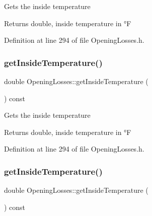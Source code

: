 Gets the inside temperature

\begin{DoxyReturn}{Returns}
double, inside temperature in °F 
\end{DoxyReturn}


Definition at line 294 of file Opening\+Losses.\+h.

\mbox{\label{class_opening_losses_abe930dab77b1c855503ee51fdf66c88a}} 
\subsubsection{\texorpdfstring{get\+Inside\+Temperature()}{getInsideTemperature()}\hspace{0.1cm}{\footnotesize\ttfamily [2/3]}}
{\footnotesize\ttfamily double Opening\+Losses\+::get\+Inside\+Temperature (\begin{DoxyParamCaption}{ }\end{DoxyParamCaption}) const\hspace{0.3cm}{\ttfamily [inline]}}

Gets the inside temperature

\begin{DoxyReturn}{Returns}
double, inside temperature in °F 
\end{DoxyReturn}


Definition at line 294 of file Opening\+Losses.\+h.

\mbox{\label{class_opening_losses_abe930dab77b1c855503ee51fdf66c88a}} 
\subsubsection{\texorpdfstring{get\+Inside\+Temperature()}{getInsideTemperature()}\hspace{0.1cm}{\footnotesize\ttfamily [3/3]}}
{\footnotesize\ttfamily double Opening\+Losses\+::get\+Inside\+Temperature (\begin{DoxyParamCaption}{ }\end{DoxyParamCaption}) const\hspace{0.3cm}{\ttfamily [inline]}}

